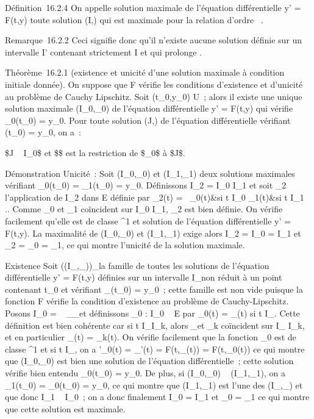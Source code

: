 \documentclass[]{article}
\begin{document}
Définition~16.2.4 On appelle solution maximale de l'équation
différentielle y' = F(t,y) toute solution (I,\phi) qui est maximale pour la
relation d'ordre \prec~.

Remarque~16.2.2 Ceci signifie donc qu'il n'existe aucune solution
définie sur un intervalle I' contenant strictement I et qui prolonge \phi.

Théorème~16.2.1 (existence et unicité d'une solution maximale à
condition initiale donnée). On suppose que F vérifie les conditions
d'existence et d'unicité au problème de Cauchy Lipschitz. Soit
(t\_0,y\_0) \in U~; alors il existe une unique solution
maximale (I\_0,\phi\_0) de l'équation différentielle y' =
F(t,y) qui vérifie \phi\_0(t\_0) = y\_0. Pour toute
solution (J,\psi) de l'équation différentielle vérifiant \psi(t\_0) =
y\_0, on a~:

\text\$J \subset~ I\_0\$ et \$\psi\$ est la restriction
de \$\phi\_0\$ à \$J\$.

Démonstration Unicité~: Soit (I\_0,\phi\_0) et
(I\_1,\phi\_1) deux solutions maximales vérifiant
\phi\_0(t\_0) = \phi\_1(t\_0) = y\_0.
Définissons I\_2 = I\_0 \cup I\_1 et soit
\phi\_2 l'application de I\_2 dans E définie par
\phi\_2(t) = \left \
\cases \phi\_0(t)&si t \in I\_0
\cr \phi\_1(t)&si t \in I\_1\\ 
\right .. Comme \phi\_0 et \phi\_1 coïncident
sur I\_0 \bigcap I\_1, \phi\_2 est bien définie. On
vérifie facilement qu'elle est de classe ^1 et solution de
l'équation différentielle y' = F(t,y). La maximalité de
(I\_0,\phi\_0) et (I\_1,\phi\_1) exige alors
I\_2 = I\_0 = I\_1 et \phi\_2 =
\phi\_0 = \phi\_1, ce qui montre l'unicité de la solution
maximale.

Existence Soit \left
((I\_\jmath,\psi\_\jmath)\right )\_\jmath{} la
famille de toutes les solutions de l'équation différentielle y' = F(t,y)
définies sur un intervalle I\_\jmath non réduit à un point contenant
t\_0 et vérifiant \psi\_\jmath(t\_0) = y\_0~;
cette famille est non vide puisque la fonction F vérifie la condition
d'existence au problème de Cauchy-Lipschitz. Posons I\_0
= \⋃ ~
\_\jmath{}\_\jmath et définissons \phi\_0 : I\_0 \rightarrow~ E
par \phi\_0(t) = \psi\_\jmath(t) si t \in I\_\jmath. Cette
définition est bien cohérente car si t \in I\_\jmath \bigcap I\_k,
alors \psi\_\jmath et \psi\_k coïncident sur I\_\jmath \bigcap
I\_k, et en particulier \psi\_\jmath(t) = \psi\_k(t). On
vérifie facilement que la fonction \phi\_0 est de classe
^1 et si t \in I\_\jmath, on a \phi'\_0(t) =
\psi\_\jmath'(t) = F(t,\psi\_\jmath(t)) = F(t,\phi\_0(t)) ce qui
montre que (I\_0,\phi\_0) est bien une solution de
l'équation différentielle~; cette solution vérifie bien entendu
\phi\_0(t\_0) = y\_0. De plus, si
(I\_0,\phi\_0) \prec~ (I\_1,\phi\_1), on a
\phi\_1(t\_0) = \phi\_0(t\_0) = y\_0,
ce qui montre que (I\_1,\phi\_1) est l'une des
(I\_\jmath,\psi\_\jmath) et que donc I\_1 \subset~ I\_0~; on
a donc finalement I\_0 = I\_1 et \phi\_0 =
\phi\_1 ce qui montre que cette solution est maximale.
\end{document}
